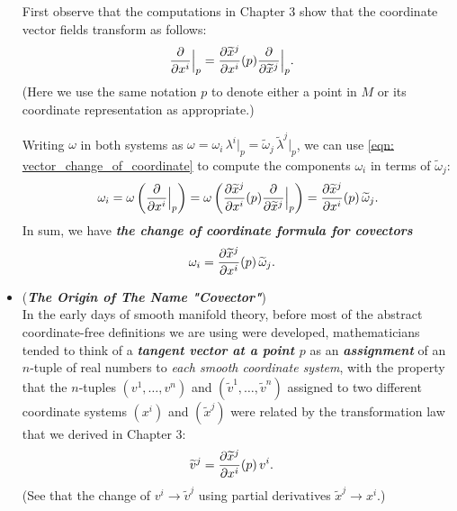 \documentclass[11pt]{article}
\begin{document}
\begin{itemize}
\begin{remark}
First observe that the computations in Chapter 3 show that the coordinate vector fields transform as follows:
\begin{align}
\frac{\partial }{ \partial x^{i}}\Bigr|_{p} &= \frac{\partial \widetilde{x}^{j}}{ \partial x^{i}}(p)\frac{\partial }{ \partial \widetilde{x}^{j}}\Bigr|_{p}. \label{eqn: vector_change_of_coordinate}
\end{align} (Here we use the same notation $p$ to denote either a point in $M$ or its coordinate representation as appropriate.)

Writing $\omega$ in both systems as $\omega = \omega_{i}\,\lambda^i\big|_{p} =  \widetilde{\omega}_{j}\,\widetilde{\lambda}^j\big|_{p} $, we can use \eqref{eqn: vector_change_of_coordinate} to compute the components $\omega_i$ in terms of $\widetilde{\omega}_{j}$:
\begin{align*}
\omega_{i} = \omega\left(\frac{\partial }{ \partial x^{i}}\Bigr|_{p}\right) = \omega\left(\frac{\partial \widetilde{x}^{j}}{ \partial x^{i}}(p)\frac{\partial }{ \partial \widetilde{x}^{j}}\Bigr|_{p}\right)= \frac{\partial \widetilde{x}^{j}}{ \partial x^{i}}(p)\,\widetilde{\omega}_{j}.
\end{align*}
In sum, we have \emph{\textbf{the change of coordinate formula for covectors}}
\begin{align}
\omega_{i} &= \frac{\partial \widetilde{x}^{j}}{ \partial x^{i}}(p)\,\widetilde{\omega}_{j}. \label{eqn: covector_change_of_coordinate}
\end{align}
\end{remark}

\item \begin{remark} (\emph{\textbf{The Origin of The Name "Covector"}}) \citep{lee2003introduction}\\
In the early days of smooth manifold theory, before most of the abstract coordinate-free definitions we are using were developed, mathematicians tended to think of a \emph{\textbf{tangent vector at a point $p$}} as an \emph{\textbf{assignment}} of an $n$-tuple of real numbers to \emph{each smooth coordinate system}, with the property that the $n$-tuples $(v^1,\ldots,v^n)$ and $(\widetilde{v}^1,\ldots, \widetilde{v}^n)$ assigned to two different coordinate systems $(x^i)$ and $(\widetilde{x}^j)$ were related by the transformation law that we derived in Chapter 3:
\begin{align}
\widetilde{v}^{j}&= \frac{\partial \widetilde{x}^{j}}{ \partial x^{i}}(p)\, v^{i}. \label{eqn: vector_component_change_of_coordinate}
\end{align} (See that the change of $v^{i} \rightarrow \widetilde{v}^{j}$ using partial derivatives $\widetilde{x}^{j} \rightarrow x^{i}$.)


\end{remark}
\end{itemize}
\end{document}
